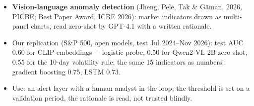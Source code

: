 \begin{itemize}\setlength{\itemsep}{2pt}
  \item \textbf{Vision-language anomaly detection} (Jheng, Pele, Tak \& Găman, 2026, PICBE; Best Paper Award, ICBE 2026): market indicators drawn as multi-panel charts, read zero-shot by GPT-4.1 with a written rationale.
  \item Our replication (S\&P 500, open models, test Jul 2024--Nov 2026): test AUC 0.60 for CLIP embeddings + logistic probe, 0.50 for Qwen2-VL-2B zero-shot, 0.55 for the 10-day volatility rule; the same 15 indicators as numbers: gradient boosting 0.75, LSTM 0.73.
  \item Use: an alert layer with a human analyst in the loop; the threshold is set on a validation period, the rationale is read, not trusted blindly.
\end{itemize}
